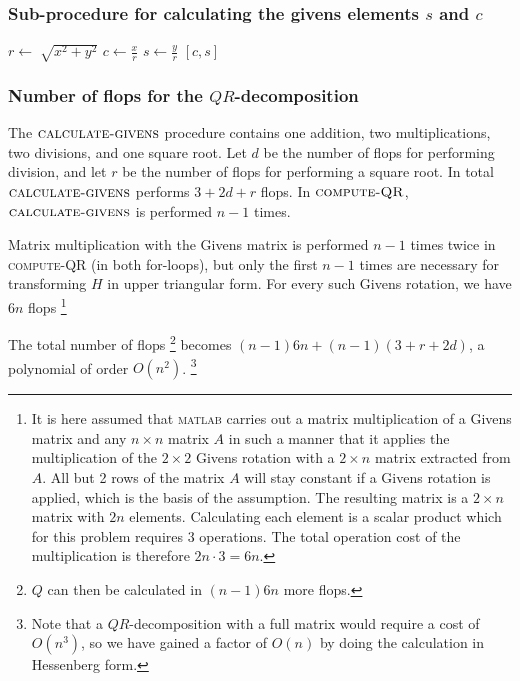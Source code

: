 \subsubsection*{Sub-procedure for calculating the givens elements $s$ and $c$}
\begin{algorithmic}
\State $r \gets \sqrt[]{x^2+y^2 }$ 
\State $c \gets \frac{x}{r} $
\State $s \gets \frac{y}{r} $
\State \Return $[c, s]$
\EndFunction
\end{algorithmic}

\subsubsection*{Number of flops for the $QR$-decomposition}
The $\textsc{calculate-givens}$ procedure contains one addition, two multiplications, two divisions, and one square root. 
Let $d$ be the number of flops for performing division, and let $r$ be the number of flops for performing a square root. 
In total $\textsc{calculate-givens}$ performs $3+2d+r$ flops. In $\textsc{compute-QR}$, $\textsc{calculate-givens}$ is performed $n-1$ times. 

Matrix multiplication with the Givens matrix is performed $n-1$ times twice in \textsc{compute-QR} (in both for-loops), but only the first $n-1$ times are necessary for transforming $H$ in upper triangular form. 
For every such Givens rotation, we have $6n$ flops \footnote{
It is here assumed that \textsc{matlab} carries out a matrix multiplication of a Givens matrix and any $n \times n$ matrix $A$ in such a manner that it applies the multiplication of the $2\times2$ Givens rotation with a $2\times n$ matrix extracted from $A$. 
All but 2 rows of the matrix $A$ will stay constant if a Givens rotation is applied, which is the basis of the assumption. 
The resulting matrix is a $2\times n$ matrix with $2n$ elements. 
Calculating each element is a scalar product which for this problem requires 3 operations. 
The total operation cost of the multiplication is therefore $2n\cdot 3=6n$. }

The total number of flops \footnote{$Q$ can then be calculated in $(n-1)6n$ more flops.} becomes $(n-1)6n+(n-1)(3+r+2d)$, a polynomial of order $O(n^2)$. \footnote{Note that a $QR$-decomposition with a full matrix would require a cost of $O(n^3)$, so we have gained a factor of $O(n)$ by doing the calculation in Hessenberg form.}

